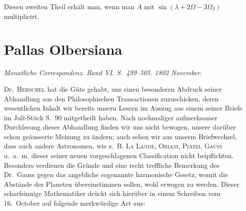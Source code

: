 \documentclass[11pt,a4paper]{book}
\begin{document}
Diesen zweiten Theil erhält man, wenn man $A$ mit $\sin(\lambda + 2\Omega - 3\Omega_{\mathrm{J}})$ multiplicirt.

\chapter*{Pallas Olbersiana}

\begin{center}
\textit{Monatliche Correspondenz. Band VI. S.~499--505. 1802 November.}
\end{center}

Dr.~\textsc{Herschel} hat die Güte gehabt, uns einen besonderen Abdruck seiner Abhandlung aus den Philosophischen Transactionen zuzuschicken, deren wesentlichen Inhalt wir bereits unsern Lesern im Auszug aus einem seiner Briefe im Juli-Stück S.~90 mitgetheilt haben. Nach nochmaliger aufmerksamer Durchlesung dieser Abhandlung finden wir uns nicht bewogen, unsere darüber schon geäusserte Meinung zu ändern; auch sehen wir aus unserm Briefwechsel, dass auch andere Astronomen, wie z.~B. \textsc{La Lande}, \textsc{Oriani}, \textsc{Piazzi}, \textsc{Gauss} u.~a.~m. dieser seiner neuen vorgeschlagenen Classification nicht beipflichten. Besonders verdienen die Gründe und eine recht treffliche Bemerkung des Dr.~Gauss gegen das angebliche sogenannte harmonische Gesetz, womit die Abstände der Planeten übereinstimmen sollen, wohl erwogen zu werden. Dieser scharfsinnige Mathematiker drückt sich hierüber in einem Schreiben vom 16.~October auf folgende merkwürdige Art aus:
\end{document}

